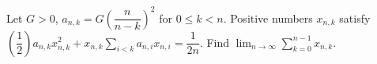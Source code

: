 Let $G>0$, $a_{n,k} = G (\dfrac{n}{n-k})^2$ for $0\le k<n$. Positive numbers $x_{n,k}$ satisfy $(\dfrac{1}{2}) a_{n,k} x_{n,k}^2 + x_{n,k} \sum_{i<k} a_{n,i} x_{n,i} = \dfrac{1}{2n}$. Find $\lim_{n\to\infty}\sum_{k=0}^{n-1}x_{n,k}$.
